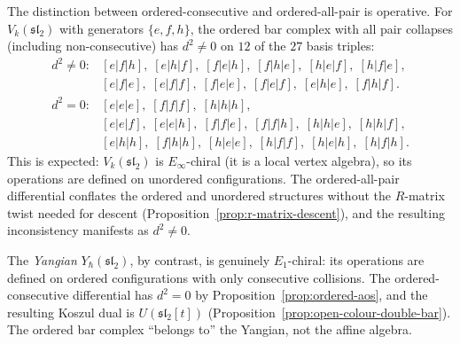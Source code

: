 \begin{remark}
\label{rem:sl2-d-squared-nonzero}
The distinction between ordered-consecutive and ordered-all-pair
is operative. For $V_k(\mathfrak{sl}_2)$ with generators
$\{e,f,h\}$, the ordered bar complex with all pair collapses
(including non-consecutive) has $d^2\ne 0$ on $12$ of the $27$
basis triples:
\[
\renewcommand{\arraystretch}{1.1}
\begin{array}{ll}
d^2\ne 0\colon & [e|f|h],\;[e|h|f],\;[f|e|h],\;
 [f|h|e],\;[h|e|f],\;[h|f|e], \\
 & [e|f|e],\;[e|f|f],\;[f|e|e],\;
 [f|e|f],\;[e|h|e],\;[f|h|f]. \\[4pt]
d^2=0\colon & [e|e|e],\;[f|f|f],\;[h|h|h], \\
 & [e|e|f],\;[e|e|h],\;[f|f|e],\;
 [f|f|h],\;[h|h|e],\;[h|h|f], \\
 & [e|h|h],\;[f|h|h],\;[h|e|e],\;
 [h|f|f],\;[h|e|h],\;[h|f|h].
\end{array}
\]
This is expected: $V_k(\mathfrak{sl}_2)$ is
$E_\infty$-chiral (it is a local vertex algebra), so its
operations are defined on unordered configurations. The
ordered-all-pair differential conflates the ordered and
unordered structures without the $R$-matrix twist
needed for descent
(Proposition~\ref{prop:r-matrix-descent}), and the
resulting inconsistency manifests as $d^2\ne 0$.

The \emph{Yangian} $Y_\hbar(\mathfrak{sl}_2)$, by contrast,
is genuinely $E_1$-chiral: its operations are defined on
ordered configurations with only consecutive collisions.
The ordered-consecutive differential has $d^2=0$ by
Proposition~\ref{prop:ordered-aos}, and the resulting
Koszul dual is $U(\mathfrak{sl}_2[t])$
(Proposition~\ref{prop:open-colour-double-bar}).
The ordered bar complex ``belongs to'' the Yangian, not
the affine algebra.
\end{remark}

